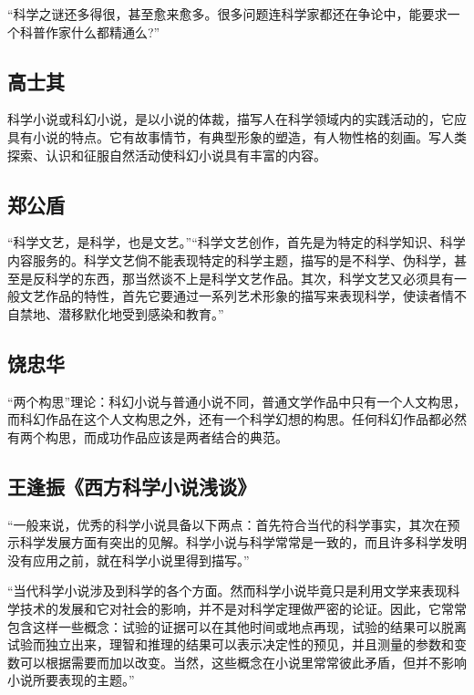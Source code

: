 \documentclass{ctexart}
\begin{document}
    “科学之谜还多得很，甚至愈来愈多。很多问题连科学家都还在争论中，能要求一个科普作家什么都精通么?”



\subsection{高士其}

    科学小说或科幻小说，是以小说的体裁，描写人在科学领域内的实践活动的，它应具有小说的特点。它有故事情节，有典型形象的塑造，有人物性格的刻画。写人类探索、认识和征服自然活动使科幻小说具有丰富的内容。



\subsection{郑公盾}

    “科学文艺，是科学，也是文艺。”“科学文艺创作，首先是为特定的科学知识、科学内容服务的。科学文艺倘不能表现特定的科学主题，描写的是不科学、伪科学，甚至是反科学的东西，那当然谈不上是科学文艺作品。其次，科学文艺又必须具有一般文艺作品的特性，首先它要通过一系列艺术形象的描写来表现科学，使读者情不自禁地、潜移默化地受到感染和教育。”



\subsection{饶忠华}

    “两个构思”理论：科幻小说与普通小说不同，普通文学作品中只有一个人文构思，而科幻作品在这个人文构思之外，还有一个科学幻想的构思。任何科幻作品都必然有两个构思，而成功作品应该是两者结合的典范。



\subsection{王逢振《西方科学小说浅谈》}

    “一般来说，优秀的科学小说具备以下两点：首先符合当代的科学事实，其次在预示科学发展方面有突出的见解。科学小说与科学常常是一致的，而且许多科学发明没有应用之前，就在科学小说里得到描写。”

    “当代科学小说涉及到科学的各个方面。然而科学小说毕竟只是利用文学来表现科学技术的发展和它对社会的影响，并不是对科学定理做严密的论证。因此，它常常包含这样一些概念：试验的证据可以在其他时间或地点再现，试验的结果可以脱离试验而独立出来，理智和推理的结果可以表示决定性的预见，并且测量的参数和变数可以根据需要而加以改变。当然，这些概念在小说里常常彼此矛盾，但并不影响小说所要表现的主题。”
\end{document}
